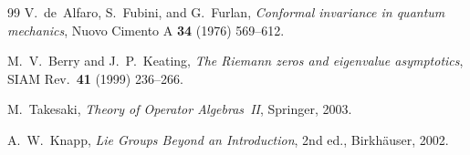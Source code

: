 \documentclass[11pt]{article}
\begin{document}
\begin{thebibliography}{99}
V.~de~Alfaro, S.~Fubini, and G.~Furlan,
\emph{Conformal invariance in quantum mechanics},
Nuovo Cimento A \textbf{34} (1976) 569--612.

M.~V.~Berry and J.~P.~Keating,
\emph{The Riemann zeros and eigenvalue asymptotics},
SIAM Rev.\ \textbf{41} (1999) 236--266.

M.~Takesaki,
\emph{Theory of Operator Algebras~II},
Springer, 2003.

A.~W.~Knapp,
\emph{Lie Groups Beyond an Introduction}, 2nd ed.,
Birkh\"auser, 2002.

\end{thebibliography}
\end{document}
